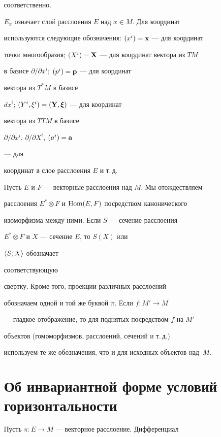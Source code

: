 соответственно.  


$E_x$ означает слой расслоения $E$ над $x\in M$. Для координат  


используются следующие обозначения: $(x^i)=\bold x$ --- для координат  


точки многообразия; $(X^i)=\bold X$ --- для координат вектора из $TM$ 


в базисе $\partial/\partial x^i$; $(p^i)=\bold p$ --- для координат 


вектора из $T^*M$ в базисе 


$dx^i$; $(Y^i,\xi^i)=(\bold Y,\boldsymbol \xi) $ --- для координат 


вектора из $TTM$ в базисе 


$\partial/\partial x^i$, $\partial/\partial X^i$, $(a^i)=\bold a$ 


--- для 


координат в слое расслоения $E$ и т.\,д. 


 


Пусть $E$ и $F$ --- векторные расслоения над $M$. Мы отождествляем  


расслоения $E^*\otimes F$ и $\operatorname{Hom}(E,F)$ посредством канонического  


изоморфизма между ними. Если $S$ --- сечение расслоения 


$E^*\otimes F$ и $X$ --- сечение $E$, то $S(X)$ или 


$\langle S;X\rangle$ обозначает 


соответствующую  


свертку. Кроме того, проекции различных расслоений 


обозначаем одной и той же буквой $\pi$. Если $f:M'\to M$ 


--- гладкое отображение, то для поднятых посредством $f$ на $M'$ 


объектов (гомоморфизмов, расслоений, сечений и т.\,д.) 


используем те же обозначения, что и для исходных объектов над~$M$. 


 


\section{Об инвариантной форме условий горизонтальности} 


 


Пусть $\pi:E\to M$ --- векторное расслоение. Дифференциал 



